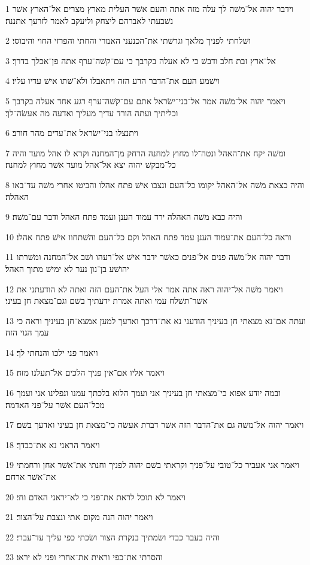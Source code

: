 \par 1 וידבר יהוה אל־משׁה לך עלה מזה אתה והעם אשׁר העלית מארץ מצרים אל־הארץ אשׁר נשׁבעתי לאברהם ליצחק וליעקב לאמר לזרעך אתננה׃
\par 2 ושׁלחתי לפניך מלאך וגרשׁתי את־הכנעני האמרי והחתי והפרזי החוי והיבוסי׃
\par 3 אל־ארץ זבת חלב ודבשׁ כי לא אעלה בקרבך כי עם־קשׁה־ערף אתה פן־אכלך בדרך׃
\par 4 וישׁמע העם את־הדבר הרע הזה ויתאבלו ולא־שׁתו אישׁ עדיו עליו׃
\par 5 ויאמר יהוה אל־משׁה אמר אל־בני־ישׂראל אתם עם־קשׁה־ערף רגע אחד אעלה בקרבך וכליתיך ועתה הורד עדיך מעליך ואדעה מה אעשׂה־לך׃
\par 6 ויתנצלו בני־ישׂראל את־עדים מהר חורב׃
\par 7 ומשׁה יקח את־האהל ונטה־לו מחוץ למחנה הרחק מן־המחנה וקרא לו אהל מועד והיה כל־מבקשׁ יהוה יצא אל־אהל מועד אשׁר מחוץ למחנה׃
\par 8 והיה כצאת משׁה אל־האהל יקומו כל־העם ונצבו אישׁ פתח אהלו והביטו אחרי משׁה עד־באו האהלה׃
\par 9 והיה כבא משׁה האהלה ירד עמוד הענן ועמד פתח האהל ודבר עם־משׁה׃
\par 10 וראה כל־העם את־עמוד הענן עמד פתח האהל וקם כל־העם והשׁתחוו אישׁ פתח אהלו׃
\par 11 ודבר יהוה אל־משׁה פנים אל־פנים כאשׁר ידבר אישׁ אל־רעהו ושׁב אל־המחנה ומשׁרתו יהושׁע בן־נון נער לא ימישׁ מתוך האהל׃
\par 12 ויאמר משׁה אל־יהוה ראה אתה אמר אלי העל את־העם הזה ואתה לא הודעתני את אשׁר־תשׁלח עמי ואתה אמרת ידעתיך בשׁם וגם־מצאת חן בעיני׃
\par 13 ועתה אם־נא מצאתי חן בעיניך הודעני נא את־דרכך ואדעך למען אמצא־חן בעיניך וראה כי עמך הגוי הזה׃
\par 14 ויאמר פני ילכו והנחתי לך׃
\par 15 ויאמר אליו אם־אין פניך הלכים אל־תעלנו מזה׃
\par 16 ובמה יודע אפוא כי־מצאתי חן בעיניך אני ועמך הלוא בלכתך עמנו ונפלינו אני ועמך מכל־העם אשׁר על־פני האדמה׃
\par 17 ויאמר יהוה אל־משׁה גם את־הדבר הזה אשׁר דברת אעשׂה כי־מצאת חן בעיני ואדעך בשׁם׃
\par 18 ויאמר הראני נא את־כבדך׃
\par 19 ויאמר אני אעביר כל־טובי על־פניך וקראתי בשׁם יהוה לפניך וחנתי את־אשׁר אחן ורחמתי את־אשׁר ארחם׃
\par 20 ויאמר לא תוכל לראת את־פני כי לא־יראני האדם וחי׃
\par 21 ויאמר יהוה הנה מקום אתי ונצבת על־הצור׃
\par 22 והיה בעבר כבדי ושׂמתיך בנקרת הצור ושׂכתי כפי עליך עד־עברי׃
\par 23 והסרתי את־כפי וראית את־אחרי ופני לא יראו׃

